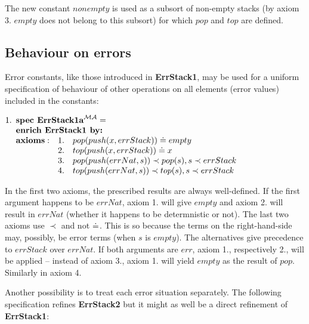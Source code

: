 \documentclass[10pt]{article}
\begin{document}
\noindent
The new constant $nonempty$ is used as a subsort of non-empty stacks (by
axiom 3. $empty$ does not belong to this subsort) for
which $pop$ and $top$ are defined. 


\subsection{Behaviour on errors}\label{subsub:er3}
Error constants, like those introduced in {\bf ErrStack1}, may be used for a
uniform specification of behaviour of other operations on all elements (error
values) included in the constants: \vspace*{1ex}

\(
1. \spec{	\tit{\mbox{\bf spec\ ErrStack1a}^{\inst{MA}}=} \\
	\tit{\mbox{\bf enrich\ ErrStack1\  by:}} \\
	 	{\bf axioms:}
			&1.& pop(push(x,errStack))\eleq empty \\
			&2.& top(push(x,errStack))\eleq x \\
			&3.& pop(push(errNat,s))\prec pop(s), s\prec errStack \\
			&4.& top(push(errNat,s))\prec top(s), s\prec errStack 
}
\) %

\noindent
In the first two axioms, the prescribed results are always well-defined. If
the first argument happens to be $errNat$, axiom 1. will give $empty$ and
axiom 2. will result in $errNat$ (whether it happens to be determnistic or
not).
The last two axioms use $\prec$ and not $\mathrel{\dot{=} }$. This is so
because the terms on the right-hand-side may, possibly, be error terms (when
$s$ is $empty$). The alternatives give precedence to
$errStack$ over $errNat$. If both arguments are $err$, axiom 1.,
respectively 2., will be applied -- instead of axiom 3., axiom 1. will yield $empty$
as the result of $pop$. Similarly in axiom 4.

Another possibility is to treat each error situation separately. The
following specification refines {\bf ErrStack2} but it might as well be a
direct refinement of {\bf ErrStack1}: \vspace*{1ex}
\end{document}
